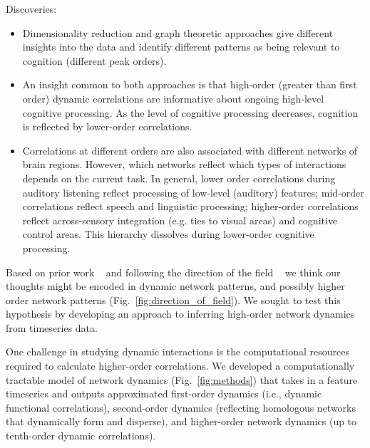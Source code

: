 \item Discoveries:
    \begin{itemize}
      \item Dimensionality reduction and graph theoretic approaches
        give different insights into the data and identify different
        patterns as being relevant to cognition (different peak
        orders).
        \item An insight common to both approaches is that high-order
          (greater than first order) dynamic correlations are
          informative about ongoing high-level cognitive processing.
          As the level of cognitive processing decreases, cognition is
          reflected by lower-order correlations.
        \item Correlations at different orders are also associated
          with different networks of brain regions.  However, which
          networks reflect which types of interactions depends on the
          current task.  In general, lower order correlations during
          auditory listening reflect processing of low-level
          (auditory) features; mid-order correlations reflect speech
          and linguistic processing; higher-order correlations reflect
          across-sensory integration (e.g. ties to visual areas) and
          cognitive control areas.  This hierarchy dissolves during
          lower-order cognitive processing.
      \end{itemize}


      



Based on prior work ~\citep{DemeEtal19} and following the direction of the field ~\citep{Turk13} we think our thoughts might be encoded in
dynamic network patterns, and possibly higher order network
patterns (Fig.~\ref{fig:direction_of_field}). We sought to test this hypothesis by developing an approach
to inferring high-order network dynamics from timeseries data. 

One challenge in studying dynamic interactions is the
computational resources required to calculate higher-order correlations. 
We developed a computationally tractable model of network dynamics (Fig.~\ref{fig:methods}) that takes in a feature
timeseries and outputs approximated first-order dynamics (i.e.,
dynamic functional correlations), second-order dynamics
(reflecting homologous networks that dynamically form and disperse),
and higher-order network dynamics (up to tenth-order dynamic
correlations).

